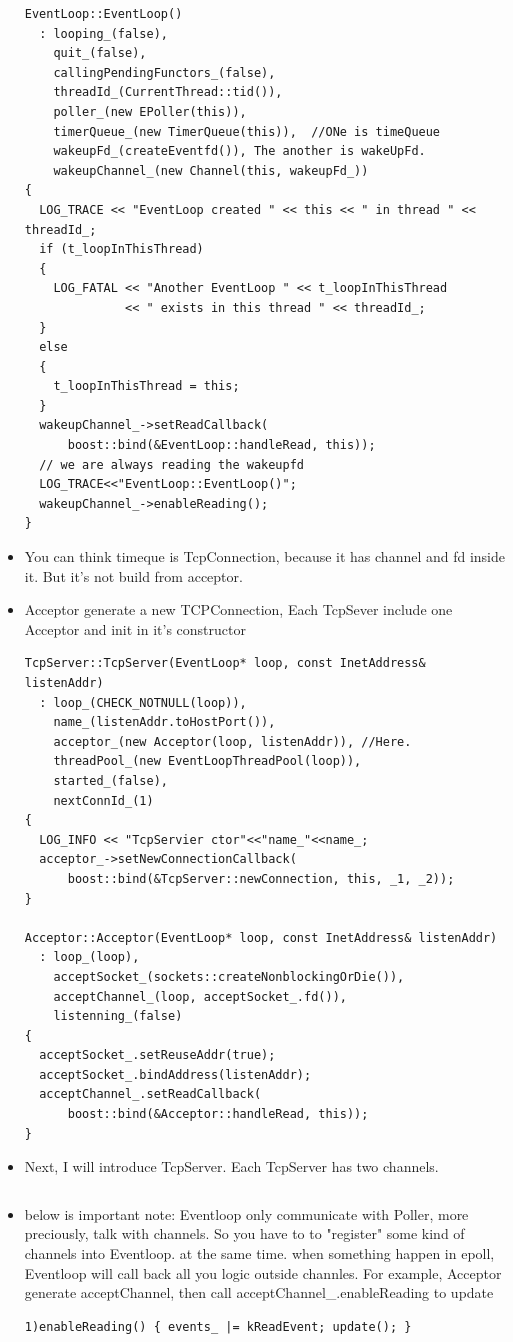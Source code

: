 \documentclass[a4paper,11pt,twoside]{book}
\begin{document}
\begin{itemize}
\begin{lstlisting}[]
EventLoop::EventLoop()
  : looping_(false),
    quit_(false),
    callingPendingFunctors_(false),
    threadId_(CurrentThread::tid()),
    poller_(new EPoller(this)),
    timerQueue_(new TimerQueue(this)),  //ONe is timeQueue
    wakeupFd_(createEventfd()), The another is wakeUpFd.
    wakeupChannel_(new Channel(this, wakeupFd_))
{
  LOG_TRACE << "EventLoop created " << this << " in thread " << threadId_;
  if (t_loopInThisThread)
  {
    LOG_FATAL << "Another EventLoop " << t_loopInThisThread
              << " exists in this thread " << threadId_;
  }
  else
  {
    t_loopInThisThread = this;
  }
  wakeupChannel_->setReadCallback(
      boost::bind(&EventLoop::handleRead, this));
  // we are always reading the wakeupfd
  LOG_TRACE<<"EventLoop::EventLoop()";
  wakeupChannel_->enableReading();
}
\end{lstlisting}

\item You can think timeque is TcpConnection, because it has channel and fd inside it.  But it's not build from acceptor. 

\item Acceptor generate a new TCPConnection, Each TcpSever include one Acceptor and init in it's constructor
\begin{lstlisting}[]
TcpServer::TcpServer(EventLoop* loop, const InetAddress& listenAddr)
  : loop_(CHECK_NOTNULL(loop)),
    name_(listenAddr.toHostPort()),
    acceptor_(new Acceptor(loop, listenAddr)), //Here. 
    threadPool_(new EventLoopThreadPool(loop)),
    started_(false),
    nextConnId_(1)
{
  LOG_INFO << "TcpServier ctor"<<"name_"<<name_;
  acceptor_->setNewConnectionCallback(
      boost::bind(&TcpServer::newConnection, this, _1, _2));
}

Acceptor::Acceptor(EventLoop* loop, const InetAddress& listenAddr)
  : loop_(loop),
    acceptSocket_(sockets::createNonblockingOrDie()),
    acceptChannel_(loop, acceptSocket_.fd()),
    listenning_(false)
{
  acceptSocket_.setReuseAddr(true);
  acceptSocket_.bindAddress(listenAddr);
  acceptChannel_.setReadCallback(
      boost::bind(&Acceptor::handleRead, this));
}
\end{lstlisting}

\item Next, I will introduce TcpServer. Each TcpServer has two channels. 
\begin{lstlisting}[]

\end{lstlisting}
\item below is important note: Eventloop only communicate with Poller, more preciously, talk with channels. So you have to to "register" some kind of channels into Eventloop. at the same time. when something happen in epoll, Eventloop will call back all you logic outside channles.  For example,  Acceptor generate acceptChannel, then call acceptChannel\_.enableReading to update 
\begin{lstlisting}[]
1)enableReading() { events_ |= kReadEvent; update(); }


\end{lstlisting}
\end{itemize}
\end{document}
